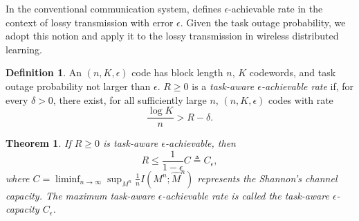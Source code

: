 \documentclass[lettersize,journal]{IEEEtran}
\theoremstyle{definition}
\newtheorem{definition}{Definition}
\theoremstyle{plain}
\newtheorem{theorem}{Theorem}
\begin{document}
In the conventional communication system, \cite{general-capacity} defines $\epsilon$-achievable rate in the context of lossy transmission with error $\epsilon$. 
Given the task outage probability, we adopt this notion and apply it to the lossy transmission in wireless distributed learning. 

\begin{definition}
    \label{thm:task_achievable_rate}
    An $(n,K,\epsilon)$ code has block length $n$, $K$ codewords, and task outage probability not larger than $\epsilon$. $R\geq 0$ is a \textit{task-aware $\epsilon$-achievable rate} if, for every $\delta>0$, there exist, for all sufficiently large $n$, $(n, K, \epsilon)$ codes with rate
    \begin{equation}
        \frac{\log K}{n} > R - \delta.
    \end{equation}
\end{definition}


\begin{theorem}
    \label{thm:max_rate}
    If $R\geq 0$ is task-aware $\epsilon$-achievable, then
    \begin{equation}
        \label{equ:max_rate}
        R \leq \frac{1}{1-\epsilon}C\triangleq C_\epsilon,
    \end{equation}
    where $C=\liminf_{n\to\infty}\sup_{M^n}\frac{1}{n}I(M^n;\hat{M}^n)$ represents the Shannon's channel capacity. The maximum task-aware $\epsilon$-achievable rate is called the task-aware $\epsilon$-capacity $C_\epsilon$.
\end{theorem}
\end{document}
